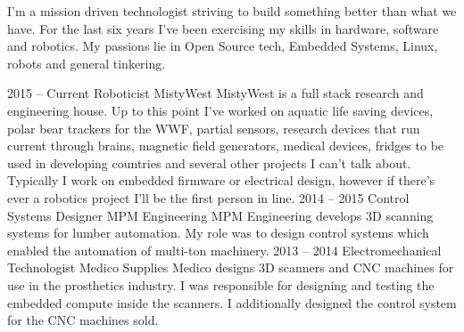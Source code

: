 \documentclass[9pt]{developercv} %
\begin{document}
\begin{minipage}[t]{0.4\textwidth} %
	\vspace{-\baselineskip} %
  I'm a mission driven technologist striving to build something better than what we have. For the last six years I've been exercising my skills in hardware, software and robotics. My passions lie in Open Source tech, Embedded Systems, Linux, robots and general tinkering. 
\end{minipage}
\hfill %
\begin{minipage}[t]{0.5\textwidth} %
	\vspace{-\baselineskip} %
	\begin{barchart}{5.5}
	\end{barchart}
\end{minipage}


\begin{entrylist}
	\entry
		{2015 -- Current}
		{Roboticist}
		{MistyWest}
		{MistyWest is a full stack research and engineering house. Up to this point I've worked on aquatic life saving devices, polar bear trackers for the WWF, partial sensors, research devices that run current through brains, magnetic field generators, medical devices, fridges to be used in developing countries and several other projects I can't talk about. Typically I work on embedded firmware or electrical design, however if there's ever a robotics project I'll be the first person in line.}
	\entry
		{2014 -- 2015}
		{Control Systems Designer}
		{MPM Engineering}
		{MPM Engineering develops 3D scanning systems for lumber automation. My role was to design control systems which enabled the automation of multi-ton machinery.}
	\entry
		{2013 -- 2014}
		{Electromechanical Technologist}
		{Medico Supplies}
		{Medico designs 3D scanners and CNC machines for use in the prosthetics industry. I was responsible for designing and testing the embedded compute inside the scanners. I additionally designed the control system for the CNC machines sold.}
\end{entrylist}
\end{document}
